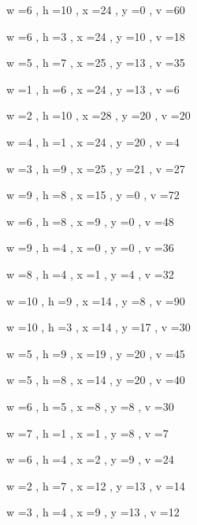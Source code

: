 \documentclass[11pt]{article}
\begin{document}
w =6 , h =10 , x =24 , y =0 , v =60
\par
w =6 , h =3 , x =24 , y =10 , v =18
\par
w =5 , h =7 , x =25 , y =13 , v =35
\par
w =1 , h =6 , x =24 , y =13 , v =6
\par
w =2 , h =10 , x =28 , y =20 , v =20
\par
w =4 , h =1 , x =24 , y =20 , v =4
\par
w =3 , h =9 , x =25 , y =21 , v =27
\par
w =9 , h =8 , x =15 , y =0 , v =72
\par
w =6 , h =8 , x =9 , y =0 , v =48
\par
w =9 , h =4 , x =0 , y =0 , v =36
\par
w =8 , h =4 , x =1 , y =4 , v =32
\par
w =10 , h =9 , x =14 , y =8 , v =90
\par
w =10 , h =3 , x =14 , y =17 , v =30
\par
w =5 , h =9 , x =19 , y =20 , v =45
\par
w =5 , h =8 , x =14 , y =20 , v =40
\par
w =6 , h =5 , x =8 , y =8 , v =30
\par
w =7 , h =1 , x =1 , y =8 , v =7
\par
w =6 , h =4 , x =2 , y =9 , v =24
\par
w =2 , h =7 , x =12 , y =13 , v =14
\par
w =3 , h =4 , x =9 , y =13 , v =12
\par
\newpage
\end{document}
